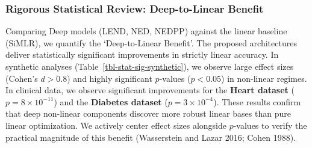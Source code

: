 \documentclass[
  letterpaper,
]{report}
\begin{document}
\subsubsection{Rigorous Statistical Review: Deep-to-Linear
Benefit}\label{rigorous-statistical-review-deep-to-linear-benefit}

Comparing Deep models (LEND, NED, NEDPP) against the linear baseline
(SiMLR), we quantify the `Deep-to-Linear Benefit'. The proposed
architectures deliver statistically significant improvements in strictly
linear accuracy. In synthetic analyses
(Table~\ref{tbl-stat-sig-synthetic}), we observe large effect sizes
(Cohen's \(d > 0.8\)) and highly significant \(p\)-values (\(p < 0.05\))
in non-linear regimes. In clinical data, we observe significant
improvements for the \textbf{Heart dataset} (\(p = 8 \times 10^{-11}\))
and the \textbf{Diabetes dataset} (\(p = 3 \times 10^{-4}\)). These
results confirm that deep non-linear components discover more robust
linear bases than pure linear optimization. We actively center effect
sizes alongside \(p\)-values to verify the practical magnitude of this
benefit (Wasserstein and Lazar 2016; Cohen 1988).
\end{document}
